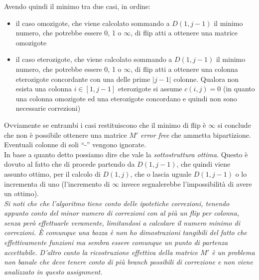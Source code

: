 \documentclass[a4paper,12pt, oneside]{book}
\begin{document}
Avendo quindi il minimo tra due casi, in ordine:
\begin{itemize}
  \item il caso omozigote, che viene calcolato sommando a $D(1,j-1)$ il minimo
  numero, che potrebbe essere 0, 1 o $\infty$, di flip atti a ottenere una
  matrice omozigote
  \item il caso eterozigote, che viene calcolato sommando a $D(1,j-1)$ il minimo
  numero, che potrebbe essere 0, 1 o $\infty$, di flip atti a ottenere una
  colonna eterozigote concordante con una delle prime $|j-1|$ colonne. Qualora
  non esista una colonna $i\in [1,j-1]$ eterozigote si assume $c(i,j)=0$ (in
  quanto una colonna omozigote ed una eterozigote concordano e quindi non sono
  necessarie correzioni)
\end{itemize}
Ovviamente se entrambi i casi restituiscono che il minimo di flip è $\infty$ si
conclude che non è possibile ottenere una matrice $M'$ \textit{error free} che
ammetta bipartizione. Eventuali colonne di soli ``-'' vengono ignorate.\\
In base a quanto detto possiamo dire che vale la \textit{sottostruttura
  ottima}. Questo è dovuto al fatto che di procede
partendo da $D(1,j-1)$, che quindi viene assunto ottimo, per il calcolo di
$D(1,j)$, che o lascia uguale $D(1,j-1)$ o lo incrementa di uno (l'incremento di
$\infty$ invece segnalerebbe l'impossibilità di avere un ottimo).\\

\textit{Si noti che che l'algoritmo tiene conto delle ipotetiche correzioni,
  tenendo appunto conto del minor numero di correzioni con al più un flip per
  colonna, senza però effettuarle veramente, limitandosi a calcolare il numero
  minimo di correzioni. È comunque una bozza è non ho dimostrazioni tangibili
  del fatto che effettivamente funzioni ma sembra essere comunque un punto di
  partenza accettabile. D'altro canto la ricostruzione effettiva della matrice
  $M'$ è un problema non banale che deve tenere conto di più branch possibili di
  correzione e non viene analizzato in questo assignment.}\\
\end{document}

